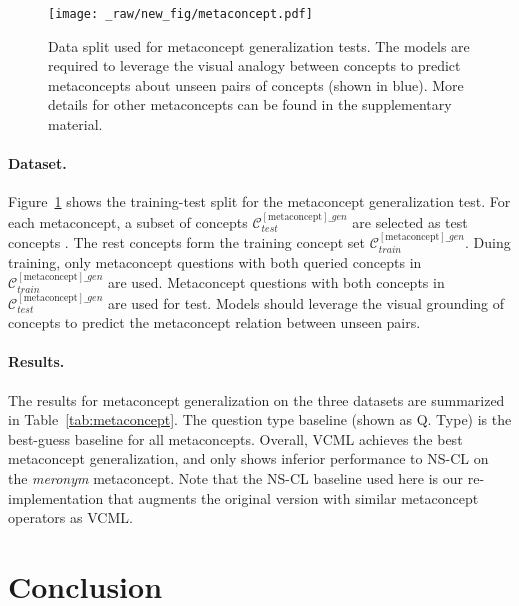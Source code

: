 \documentclass{article}
\newcommand{\fig}[1]{Figure~\ref{#1}}
\newcommand{\tbl}[1]{Table~\ref{#1}}
\newcommand{\model}{VCML\xspace}
\newcommand{\myparagraph}[1]{\vspace{-10pt}\paragraph{#1}}
\begin{document}
\begin{figure}[t!]
    \vspace{-1em}
    \centering
    \texttt{[image: \_raw/new\_fig/metaconcept.pdf]}
    \caption{Data split used for metaconcept generalization tests. The models are required to leverage the visual analogy between concepts to predict metaconcepts about unseen pairs of concepts (shown in blue). More details for other metaconcepts can be found in the supplementary material.}
    \label{fig:data-metaconcept}
    \vspace{-1em}
\end{figure} 
\myparagraph{Dataset.}
\fig{fig:data-metaconcept} shows the training-test split for the metaconcept generalization test. For each metaconcept, a subset of concepts $\mathcal{C}_\mathit{test}^{[\text{metaconcept}]\mathit{\_gen}}$ are selected as test concepts . The rest concepts form the training concept set $\mathcal{C}_\mathit{train}^{[\text{metaconcept}]\mathit{\_gen}}$. Duing training, only metaconcept questions with both queried concepts in $\mathcal{C}_\mathit{train}^{[\text{metaconcept}]\mathit{\_gen}}$ are used. Metaconcept questions with both concepts in $\mathcal{C}_\mathit{test}^{[\text{metaconcept}]\mathit{\_gen}}$ are used for test.
Models should leverage the visual grounding of concepts to predict the metaconcept relation between unseen pairs.


\myparagraph{Results.}

The results for metaconcept generalization on the three datasets are summarized in \tbl{tab:metaconcept}. The question type baseline (shown as Q. Type) is the best-guess baseline for all metaconcepts. Overall, \model achieves the best metaconcept generalization, and only shows inferior performance to NS-CL on the \textit{meronym} metaconcept. Note that the NS-CL baseline used here is our re-implementation that augments the original version with similar metaconcept operators as \model.




\section{Conclusion}
\end{document}

